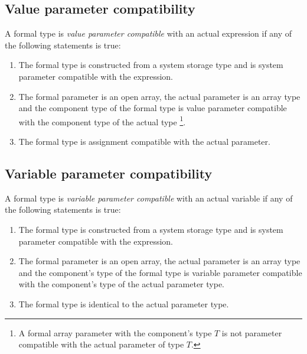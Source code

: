 \subsection{Value parameter compatibility}

A formal type is {\em value parameter compatible} with an actual
expression if any of the following statements is true:
\renewcommand{\theenumi}{\alph{enumi}}
\begin{enumerate}
\item   The formal type is constructed from a system storage type
        and is system parameter compatible with the expression.

\item   The formal parameter is an open array, the actual
        parameter is an array type and the component type
        of the formal type is value parameter compatible
        with the component type of the actual type
        \footnote{A formal array parameter with the component's type $T$
        is not parameter compatible with the actual parameter of type $T$.}.

\item   The formal type is assignment compatible with the actual
        parameter.
\end{enumerate}
\renewcommand{\theenumi}{\arabic{enumi}}

\subsection{Variable parameter compatibility}

A formal type is {\em variable parameter compatible} with an actual
variable if any of the following statements is true:
\renewcommand{\theenumi}{\alph{enumi}}
\begin{enumerate}
\item   The formal type is constructed from a system storage type
        and is system parameter compatible with the expression.

\item   The formal parameter is an open array, the actual
        parameter is an array type and the component's type
        of the formal type is variable parameter compatible
        with the component's type of the actual parameter type.

\item   The formal type is identical to the actual parameter type.
\end{enumerate}
\renewcommand{\theenumi}{\arabic{enumi}}

